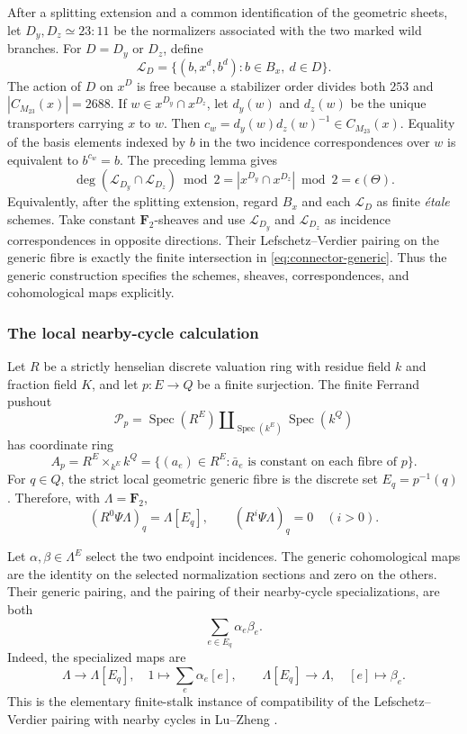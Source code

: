 \documentclass[11pt]{amsart}
\theoremstyle{definition}
\theoremstyle{remark}
\newcommand{\FF}{\mathbf F}
\newcommand{\Cx}{C_{M_{23}}(x)}
\begin{document}
After a splitting extension and a common identification of the geometric
sheets, let $D_y,D_z\simeq23{:}11$ be the normalizers associated with the two
marked wild branches.  For $D=D_y$ or $D_z$, define
\[
 \mathcal L_D=\{(b,x^d,b^d):b\in B_x,\ d\in D\}.
\]
The action of $D$ on $x^D$ is free because a stabilizer order divides both
$253$ and $|\Cx|=2688$.  If $w\in x^{D_y}\cap x^{D_z}$, let $d_y(w)$ and
$d_z(w)$ be the unique transporters carrying $x$ to $w$.  Then
$c_w=d_y(w)d_z(w)^{-1}\in\Cx$.  Equality of the basis elements indexed by
$b$ in the two incidence correspondences over $w$ is equivalent to
$b^{c_w}=b$.  The preceding lemma gives
\begin{equation}
 \deg(\mathcal L_{D_y}\cap\mathcal L_{D_z})\bmod2
 =|x^{D_y}\cap x^{D_z}|\bmod2
 =\epsilon(\Theta).
\label{eq:connector-generic}
\end{equation}
Equivalently, after the splitting extension, regard $B_x$ and each
$\mathcal L_D$ as finite \emph{\'etale} schemes.  Take constant
$\FF_2$-sheaves and use $\mathcal L_{D_y}$ and
$\mathcal L_{D_z}$ as incidence correspondences in opposite directions.
Their Lefschetz--Verdier pairing on the generic fibre
is exactly the finite intersection in \eqref{eq:connector-generic}.  Thus the
generic construction specifies the schemes, sheaves, correspondences, and
cohomological maps explicitly.

\subsubsection{The local nearby-cycle calculation}

Let $R$ be a strictly henselian discrete valuation ring with residue field
$k$ and fraction field $K$, and let $p:E\to Q$ be a finite surjection.  The
finite Ferrand pushout \cite{Ferrand}
\[
 \mathcal P_p=
 \operatorname{Spec}(R^E)\amalg_{\operatorname{Spec}(k^E)}
 \operatorname{Spec}(k^Q)
\]
has coordinate ring
\[
 A_p=R^E\mathop{\times}_{k^E}k^Q
 =\{(a_e)\in R^E:\bar a_e\text{ is constant on each fibre of }p\}.
\]
For $q\in Q$, the strict local geometric generic fibre is the discrete set
$E_q=p^{-1}(q)$.  Therefore, with $\Lambda=\FF_2$,
\begin{equation}
 (R^0\Psi\Lambda)_q=\Lambda[E_q],\qquad
 (R^i\Psi\Lambda)_q=0\quad(i>0).
\label{eq:correct-nearby-stalk}
\end{equation}

Let $\alpha,\beta\in\Lambda^E$ select the two endpoint incidences.  The
generic cohomological maps are the identity on the selected normalization
sections and zero on the others.  Their generic pairing, and the pairing of
their nearby-cycle specializations, are both
\begin{equation}
 \sum_{e\in E_q}\alpha_e\beta_e.
\label{eq:tagged-pairing}
\end{equation}
Indeed, the specialized maps are
\[
 \Lambda\longrightarrow\Lambda[E_q],\quad
 1\longmapsto\sum_e\alpha_e[e],
 \qquad
 \Lambda[E_q]\longrightarrow\Lambda,\quad
 [e]\longmapsto\beta_e.
\]
This is the elementary finite-stalk instance of compatibility of the
Lefschetz--Verdier pairing with nearby cycles in Lu--Zheng
\cite[Corollary~3.10]{LuZheng}.
\end{document}
